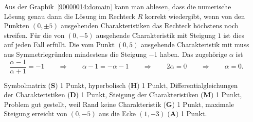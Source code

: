 \begin{loesung}
\begin{teilaufgaben}
\item
Aus der Graphik~\ref{90000014:domain} kann man ablesen,
dass die numerische Lösung genau dann
die Lösung im Rechteck $R$ korrekt wiedergibt, wenn von den Punkten
$(0,\pm 5)$ ausgehenden Charakteristiken das Rechteck höchstens noch 
streifen.
Für die von $(0,-5)$ ausgehende Charakteristik mit Steigung $1$ ist
dies auf jeden Fall erfüllt.
Die vom Punkt $(0,5)$ ausgehende Charakteristik mit muss aus
Symmetriegründen mindestens die Steigung $-1$ haben.
Das zugehörige $\alpha$ ist
\[
\frac{\alpha - 1}{\alpha + 1}=-1
\qquad\Rightarrow\qquad
\alpha - 1 = -\alpha - 1
\qquad\Rightarrow\qquad
2\alpha=0
\qquad\Rightarrow\qquad
\alpha =0.
\]
\qedhere
\end{teilaufgaben}
\end{loesung}

\begin{bewertung}
Symbolmatrix ({\bf S}) 1 Punkt,
hyperbolisch ({\bf H}) 1 Punkt,
Differentialgleichungen der Charakteristiken ({\bf D}) 1 Punkt,
Steigung der Charakteristiken ({\bf M}) 1 Punkt,
Problem gut gestellt, weil Rand keine Charakteristik ({\bf G}) 1 Punkt,
maximale Steigung erreicht von $(0,-5)$ aus die Ecke $(1,-3)$ ({\bf A})
1 Punkt.
\end{bewertung}
